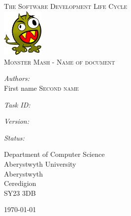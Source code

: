 \documentclass[a4paper]{article}
\begin{document}
\pagestyle{fancy}
\begin{center}
\textsc{\LARGE The Software Development Life Cycle}\\[1.5cm]\includegraphics[width=0.15\textwidth]{img/monster.png}\\[1.5cm] %
\textsc{\Large Monster Mash - Name of document}\\[0.5cm] %

\begin{minipage}{0.8\textwidth}
\begin{flushleft} \large
\emph{Authors:}\\
First name \textsc{Second name}\\
\end{flushleft}
\end{minipage}
\vspace{8 mm}

\begin{minipage}{0.8\textwidth}
\begin{flushleft} \large
\emph{Task ID:}
\end{flushleft}
\end{minipage}
\vspace{8 mm}

\begin{minipage}{0.8\textwidth}
\begin{flushleft} \large
\emph{Version:}
\end{flushleft}
\end{minipage}
\vspace{8 mm}

\begin{minipage}{0.8\textwidth}
\begin{flushleft} \large
\emph{Status:}
\end{flushleft}
\end{minipage}
\vspace{8 mm}

\begin{minipage}{0.8\textwidth}
\begin{flushleft} \large
Department of Computer Science\\
Aberystwyth University\\
Aberystwyth\\
Ceredigion\\
SY23 3DB\\
\end{flushleft}
\end{minipage}
\vfill
{\large \today}
\end{center}
\end{document}
